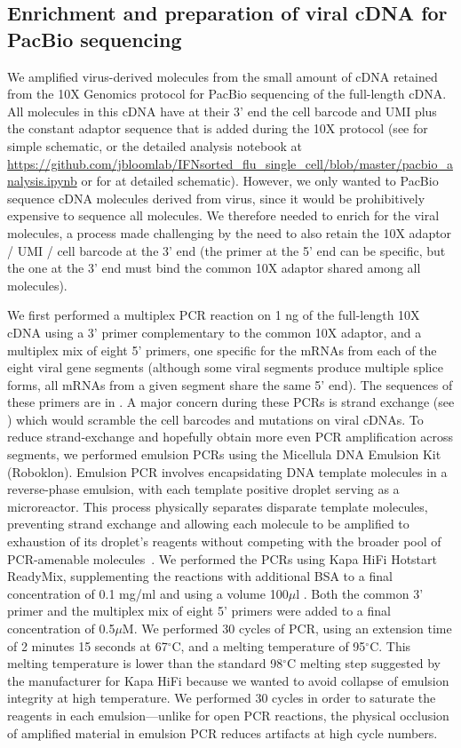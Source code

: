 \documentclass[9pt,lineno]{template}
\begin{document}
\subsection{Enrichment and preparation of viral cDNA for PacBio sequencing}
We amplified virus-derived molecules from the small amount of cDNA retained from the 10X Genomics protocol for PacBio sequencing of the full-length cDNA.
All molecules in this cDNA have at their 3' end the cell barcode and UMI plus the constant adaptor sequence that is added during the 10X protocol (see  for simple schematic, or the detailed analysis notebook at \url{https://github.com/jbloomlab/IFNsorted_flu_single_cell/blob/master/pacbio_analysis.ipynb} or  for at detailed schematic).
However, we only wanted to PacBio sequence cDNA molecules derived from virus, since it would be prohibitively expensive to sequence all molecules.
We therefore needed to enrich for the viral molecules, a process made challenging by the need to also retain the 10X adaptor / UMI / cell barcode at the 3' end (the primer at the 5' end can be specific, but the one at the 3' end must bind the common 10X adaptor shared among all molecules).

We first performed a multiplex PCR reaction on 1 ng of the full-length 10X cDNA using a 3' primer complementary to the common 10X adaptor, and a multiplex mix of eight 5' primers, one specific for the mRNAs from each of the eight viral gene segments (although some viral segments produce multiple splice forms, all mRNAs from a given segment share the same 5' end).
The sequences of these primers are in .
A major concern during these PCRs is strand exchange (see ) which would scramble the cell barcodes and mutations on viral cDNAs.
To reduce strand-exchange and hopefully obtain more even PCR amplification across segments, we performed emulsion PCRs using the Micellula DNA Emulsion Kit (Roboklon).
Emulsion PCR involves encapsidating DNA template molecules in a reverse-phase emulsion, with each template positive droplet serving as a microreactor.
This process physically separates disparate template molecules, preventing strand exchange and allowing each molecule to be amplified to exhaustion of its droplet's reagents without competing with the broader pool of PCR-amenable molecules~\citep{Boers:2015emulsion}.
We performed the PCRs using Kapa HiFi Hotstart ReadyMix, supplementing the reactions with additional BSA to a final concentration of 0.1 mg/ml and using a volume 100$\mu$l .
Both the common 3' primer and the multiplex mix of eight 5' primers were added to a final concentration of 0.5$\mu$M.
We performed 30 cycles of PCR, using an extension time of 2 minutes 15 seconds at 67$^{\circ}$C, and a melting temperature of 95$^{\circ}$C.
This melting temperature is lower than the standard 98$^{\circ}$C melting step suggested by the manufacturer for Kapa HiFi because we wanted to avoid collapse of emulsion integrity at high temperature.
We performed 30 cycles in order to saturate the reagents in each emulsion---unlike for open PCR reactions, the physical occlusion of amplified material in emulsion PCR reduces artifacts at high cycle numbers.
\end{document}
